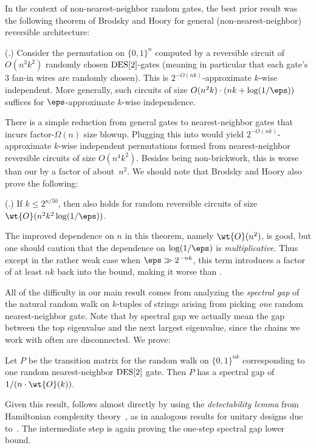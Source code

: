 In the context of non-nearest-neighbor random gates, the best prior result was the following theorem of Brodsky and Hoory for general (non-nearest-neighbor) reversible architecture:
\begin{theorem} \label{thm:BH}
    (\cite{brodsky2008simple}.)
    Consider the permutation on $\{0,1\}^n$ computed by a reversible circuit of $O(n^3 k^2)$ randomly chosen $\mathrm{DES}[2]$-gates (meaning in particular that each gate's $3$ fan-in wires are randomly chosen).
    This is $2^{-O(nk)}$-approximate $k$-wise independent.  More generally, such circuits of size $O(n^2 k) \cdot (nk + \log(1/\eps))$ suffices for $\eps$-approximate $k$-wise independence.
\end{theorem}
There is a simple reduction from general gates to nearest-neighbor gates that incurs factor-$\Omega(n)$ size blowup.  Plugging this into  would yield $2^{-O(nk)}$-approximate $k$-wise independent permutations formed from nearest-neighbor reversible circuits of size $O(n^4 k^2)$. Besides being non-brickwork, this is worse than our  by a factor of about~$n^2$.
We should note that Brodsky and Hoory also prove the following:
\begin{theorem} \label{thm:BH2}
    (\cite{brodsky2008simple}.)
    If $k \leq 2^{n/50}$, then  also holds for random reversible circuits of size $\wt{O}(n^2 k^2 \log(1/\eps))$.
\end{theorem}
\noindent The improved dependence on $n$ in this theorem, namely $\wt{O}(n^2)$, is good, but one should caution that the dependence on $\log(1/\eps)$ is \emph{multiplicative}.  Thus except in the rather weak case when $\eps \gg 2^{-nk}$, this term introduces a factor of at least $nk$ back into the bound, making it worse than .

All of the difficulty in our main result  comes from analyzing the \emph{spectral gap} of the natural random walk on $k$-tuples of strings arising from picking \emph{one} random nearest-neighbor gate. Note that by spectral gap we actually mean the gap between the top eigenvalue and the next largest eigenvalue, since the chains we work with often are disconnected. We prove:
\begin{theorem} \label{thm:one-random-local}
    Let $P$ be the transition matrix for the random walk on $\{0,1\}^{nk}$ corresponding to one random nearest-neighbor $\mathrm{DES}[2]$ gate. Then $P$ has a spectral gap of $1/(n \cdot \wt{O}(k))$.
\end{theorem}
Given this result,  follows almost directly by using the \textit{detectability lemma} from Hamiltonian complexity theory~\cite{aharonov2009detectability}, as in analogous results for unitary designs due to~\cite{brandao2016local}. The intermediate step is again proving the one-step spectral gap lower bound.

